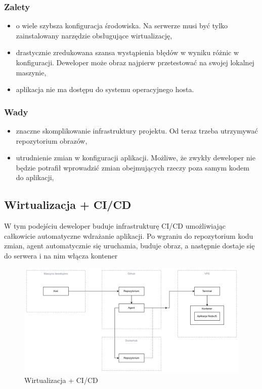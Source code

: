 \documentclass{article}
\begin{document}
\subsubsection{Zalety}

\begin{itemize}
    \item o wiele szybsza konfiguracja środowiska. Na serwerze musi być tylko zainstalowany narzędzie obsługujące wirtualizację,
    \item drastycznie zredukowana szansa wystąpienia błędów w wyniku różnic w konfiguracji. Deweloper może obraz najpierw przetestować na swojej lokalnej maszynie,
    \item aplikacja nie ma dostępu do systemu operacyjnego hosta.
\end{itemize}

\subsubsection{Wady}

\begin{itemize}
    \item znaczne skomplikowanie infrastruktury projektu. Od teraz trzeba utrzymywać repozytorium obrazów,
    \item utrudnienie zmian w konfiguracji aplikacji. Możliwe, że zwykły deweloper nie będzie potrafił wprowadzić zmian obejmujących rzeczy poza samym kodem do aplikacji,
\end{itemize}

\subsection{Wirtualizacja + CI/CD}

W tym podejściu deweloper buduje infrastrukturę CI/CD umożliwiając całkowicie automatyczne wdrażanie aplikacji. Po wgraniu do repozytorium kodu zmian, agent automatycznie się uruchamia, buduje obraz, a następnie dostaje się do serwera i na nim włącza kontener

\begin{figure}[H]
    \centering
    \includegraphics[width=1\linewidth]{automatycznaWirtualizacja.png}
    \caption{Wirtualizacja + CI/CD}
    \label{fig:enter-label}
\end{figure}
\end{document}
